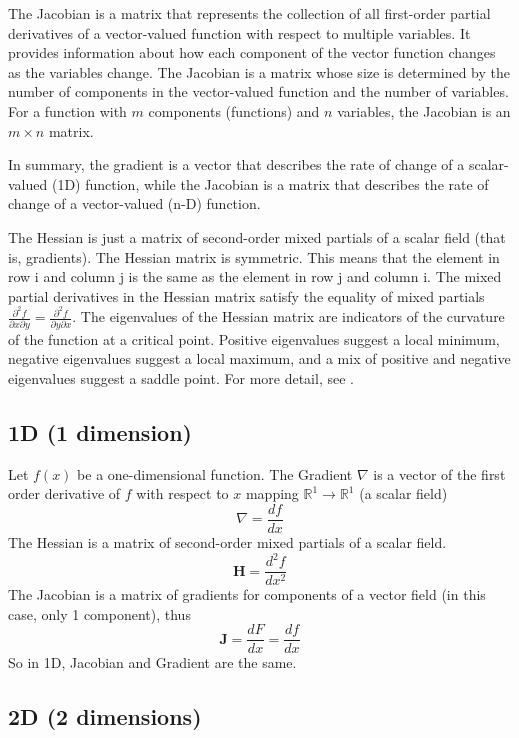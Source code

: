 \documentclass[11pt,a4paper]{book}
\theoremstyle{definition}\newtheorem{definition}{Definition}
\theoremstyle{definition}\newtheorem{fact}{Fact}
\theoremstyle{definition}\newtheorem{remark}{Remark}
\theoremstyle{definition}\newtheorem{ex}{Ex.}
\theoremstyle{definition}\newtheorem{project}{Project}
\theoremstyle{definition}\newtheorem{problem}{Problem}
\theoremstyle{definition}\newtheorem{example}{Example}
\numberwithin{theorem}{section}
\numberwithin{corollary}{chapter}
\numberwithin{assumption}{chapter}
\numberwithin{definition}{chapter}
\numberwithin{prop}{chapter}
\numberwithin{notation}{chapter}
\numberwithin{problem}{chapter}
\numberwithin{example}{chapter}
\numberwithin{fact}{chapter}
\numberwithin{ex}{chapter}
\def\R{\mathbb R}
\def\R{\mathbb R}
\begin{document}
\begin{appendices}
	The Jacobian is a matrix that represents the collection of all first-order partial derivatives of a vector-valued function with respect to multiple variables. It provides information about how each component of the vector function changes as the variables change. The Jacobian is a matrix whose size is determined by the number of components in the vector-valued function and the number of variables. For a function with $m$ components (functions) and $n$ variables, the Jacobian is an $m \times n$ matrix.
	
	In summary, the gradient is a vector that describes the rate of change of a scalar-valued (1D) function, while the Jacobian is a matrix that describes the rate of change of a vector-valued (n-D) function.
	
	The Hessian is just a matrix of second-order mixed partials of a scalar field (that is, gradients). The Hessian matrix is symmetric. This means that the element in row 
	i and column 
	j is the same as the element in row 
	j and column 
	i.
	The mixed partial derivatives in the Hessian matrix satisfy the equality of mixed partials $\frac{\partial^2 f}{\partial x \partial y} = \frac{\partial^2 f}{\partial y\partial x}$. The eigenvalues of the Hessian matrix are indicators of the curvature of the function at a critical point. Positive eigenvalues suggest a local minimum, negative eigenvalues suggest a local maximum, and a mix of positive and negative eigenvalues suggest a saddle point. For more detail, see \citet[Ch 10]{springcamp}.
	
	\subsection*{1D (1 dimension)}
	Let \( f(x) \) be a one-dimensional function. The Gradient \( \nabla \) is a vector of the first order derivative of \( f \) with respect to \( x \) mapping $\R^1 \to \R^1$ (a scalar field)
	\[
	\nabla = \dfrac{df}{dx}
	\]
	The Hessian is a matrix of second-order mixed partials of a scalar field.
	\[
	\mathbf{H} = \dfrac{d^2f}{dx^2}
	\]	
	The Jacobian is a matrix of gradients for components of a vector field (in this case, only 1 component), thus
	\[
	\mathbf{J} = \dfrac{dF}{dx} = \dfrac{df}{dx}
	\]	
	So in 1D, Jacobian and Gradient are the same.	
	
	\subsection*{2D (2 dimensions)}
	

\end{appendices}
\end{document}

